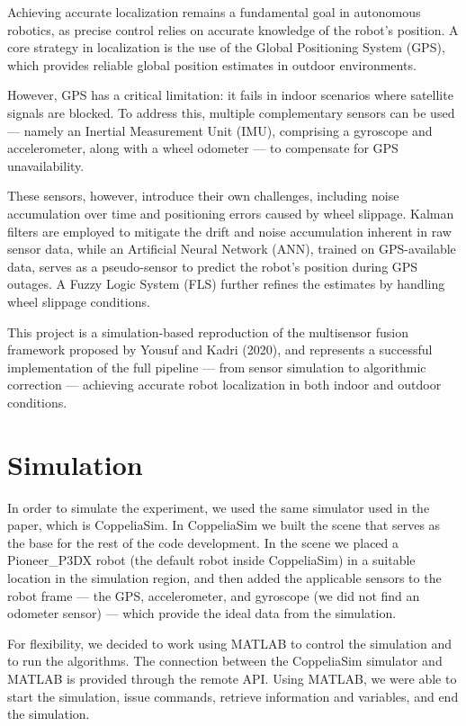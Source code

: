 \documentclass[11pt,a4paper]{article}
\begin{document}
Achieving accurate localization remains a fundamental goal in autonomous robotics,
as precise control relies on accurate knowledge of the robot's position. A core
strategy in localization is the use of the Global Positioning System (GPS), which
provides reliable global position estimates in outdoor environments.

However, GPS has a critical limitation: it fails in indoor scenarios where
satellite signals are blocked. To address this, multiple complementary sensors can
be used --- namely an Inertial Measurement Unit (IMU), comprising a gyroscope and
accelerometer, along with a wheel odometer --- to compensate for GPS unavailability.

These sensors, however, introduce their own challenges, including noise accumulation
over time and positioning errors caused by wheel slippage. Kalman filters are
employed to mitigate the drift and noise accumulation inherent in raw sensor data,
while an Artificial Neural Network (ANN), trained on GPS-available data, serves as a
pseudo-sensor to predict the robot's position during GPS outages. A Fuzzy Logic
System (FLS) further refines the estimates by handling wheel slippage conditions.

This project is a simulation-based reproduction of the multisensor fusion framework
proposed by Yousuf and Kadri (2020), and represents a successful implementation of
the full pipeline --- from sensor simulation to algorithmic correction ---
achieving accurate robot localization in both indoor and outdoor conditions.


\section{Simulation}

In order to simulate the experiment, we used the same simulator used in the paper,
which is CoppeliaSim. In CoppeliaSim we built the scene that serves as the base for
the rest of the code development. In the scene we placed a Pioneer\_P3DX robot (the
default robot inside CoppeliaSim) in a suitable location in the simulation region,
and then added the applicable sensors to the robot frame --- the GPS, accelerometer,
and gyroscope (we did not find an odometer sensor) --- which provide the ideal data
from the simulation.

For flexibility, we decided to work using MATLAB to control the simulation and to
run the algorithms. The connection between the CoppeliaSim simulator and MATLAB is
provided through the remote API. Using MATLAB, we were able to start the simulation,
issue commands, retrieve information and variables, and end the simulation.
\end{document}
